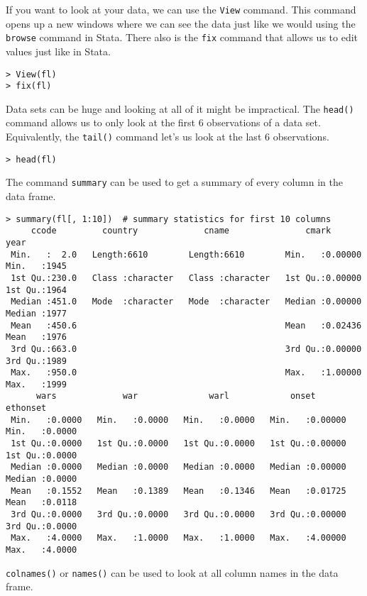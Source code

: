 If you want to look at your data, we can use the \texttt{View} command. This command opens up a new windows where we can see the data just like we would using the \texttt{browse} command in Stata. There also is the \texttt{fix} command that allows us to edit values just like in Stata.

\begin{lstlisting}
> View(fl)
> fix(fl)
\end{lstlisting}

Data sets can be huge and looking at all of it might be impractical. The \texttt{head()} command allows us to only look at the first 6 observations of a data set. Equivalently, the \texttt{tail()} command let's us look at the last 6 observations.

\begin{lstlisting}
> head(fl)
\end{lstlisting}

The command \texttt{summary} can be used to get a summary of every column in the data frame.

\begin{lstlisting}
> summary(fl[, 1:10])  # summary statistics for first 10 columns
     ccode         country             cname               cmark              year     
 Min.   :  2.0   Length:6610        Length:6610        Min.   :0.00000   Min.   :1945  
 1st Qu.:230.0   Class :character   Class :character   1st Qu.:0.00000   1st Qu.:1964  
 Median :451.0   Mode  :character   Mode  :character   Median :0.00000   Median :1977  
 Mean   :450.6                                         Mean   :0.02436   Mean   :1976  
 3rd Qu.:663.0                                         3rd Qu.:0.00000   3rd Qu.:1989  
 Max.   :950.0                                         Max.   :1.00000   Max.   :1999  
      wars             war              warl            onset            ethonset     
 Min.   :0.0000   Min.   :0.0000   Min.   :0.0000   Min.   :0.00000   Min.   :0.0000  
 1st Qu.:0.0000   1st Qu.:0.0000   1st Qu.:0.0000   1st Qu.:0.00000   1st Qu.:0.0000  
 Median :0.0000   Median :0.0000   Median :0.0000   Median :0.00000   Median :0.0000  
 Mean   :0.1552   Mean   :0.1389   Mean   :0.1346   Mean   :0.01725   Mean   :0.0118  
 3rd Qu.:0.0000   3rd Qu.:0.0000   3rd Qu.:0.0000   3rd Qu.:0.00000   3rd Qu.:0.0000  
 Max.   :4.0000   Max.   :1.0000   Max.   :1.0000   Max.   :4.00000   Max.   :4.0000 
\end{lstlisting}

\texttt{colnames()} or \texttt{names()} can be used to look at all column names in the data frame.

